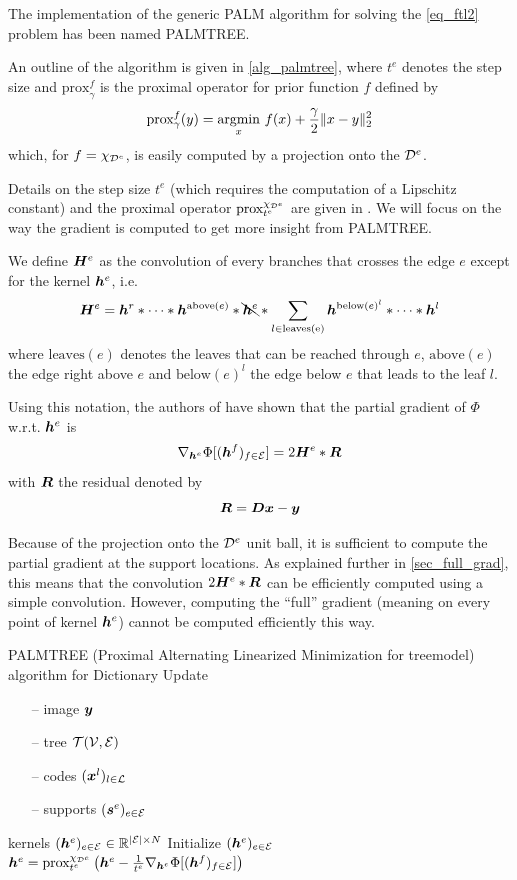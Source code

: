 The implementation of the generic \ac{PALM} algorithm for solving the \eqref{eq_ftl2} problem has been named \ac{PALMTREE}. 

An outline of the algorithm is given in \cref{alg_palmtree}, where $t^e$ denotes the step size and $\text{prox}^f_\gamma$ is the proximal operator for prior function $f$ defined by $$\text{prox}^f_\gamma(y) = \underset{x}{\operatorname{argmin}}~ f(x) + \frac{\gamma}{2} \lVert x - y \rVert^2_2$$ which, for $f = \chi_{{\mathcal D}^e}$, is easily computed by a projection onto the ${\mathcal D}^e$.

Details on the step size $t^e$ (which requires the computation of a Lipschitz constant) and the proximal operator $\text{prox}^{\chi_{{\mathcal D}^e}}_{t^e}$ are given in \cite{chabiron_optimization_2016}. We will focus on the way the gradient is computed to get more insight from \ac{PALMTREE}.

We define $\bm{H}^e$ as the convolution of every branches that crosses the edge $e$ except for the kernel $\bm{h}^e$, i.e. $$\bm{H}^e = \bm{h}^r * \dots * \bm{h}^{\text{above}(e)} * \bcancel{\bm{h}^{e}} * \sum_{l \in \text{leaves(e)}} \bm{h}^{\text{below}(e)^l} * \dots * \bm{h}^{l}$$ where $\text{leaves}(e)$ denotes the leaves that can be reached through $e$, $\text{above}(e)$  the edge right above $e$ and $\text{below}(e)^l$ the edge below $e$ that leads to the leaf $l$.

Using this notation, the authors of \cite{chabiron_optimization_2016} have shown that the partial gradient of $\Phi$ w.r.t. $\bm{h}^e$ is 
$$\nabla_{\bm{h}^e} \Phi[(\bm{h}^f)_{f \in \mathcal E}] = 2 \bm{H}^e * \bm{R}$$ with $\bm{R}$ the residual denoted by
$$\bm{R} = \bm{D}\bm{x} - \bm{y}$$

Because of the projection onto the ${\mathcal D}^e$ unit ball, it is sufficient to compute the partial gradient at the support locations. As explained further in \cref{sec_full_grad}, this means that the convolution $2 \bm{H}^e * \bm{R}$ can be efficiently computed using a simple convolution. However, computing the “full” gradient (meaning on every point of kernel $\bm{h}^e$) cannot be computed efficiently this way.

\begin{algorithm}[!ht]
    \caption{\ac{PALMTREE} (Proximal Alternating Linearized Minimization for \Gls{treemodel}) algorithm for Dictionary Update}\label{alg_palmtree}
  \begin{algorithmic}[1]
    \Input
    \begin{itemize}
    	\item[--] image $\bm{y}$
    	\item[--] tree $\mathcal T(\mathcal V,\mathcal E)$
    	\item[--] codes $(\bm{x}^l)_{l \in \mathcal L}$
    	\item[--] supports $(\bm{s}^e)_{e \in \mathcal E}$
    \end{itemize}
    \Output kernels $(\bm{h}^e)_{e \in \mathcal E} \in \mathbb{R}^{|\mathcal E| \times N}$
    \State Initialize $(\bm{h}^e)_{e \in \mathcal E}$
      	\State $\bm{h}^e = \text{prox}^{\chi_{{\mathcal D}^e}}_{t^e} \left(\bm{h}^e-\frac{1}{t^e} \nabla_{\bm{h}^e} \Phi[(\bm{h}^f)_{f \in \mathcal E}] \right)$
      \EndFor
    \EndWhile
  \end{algorithmic}
\end{algorithm}




